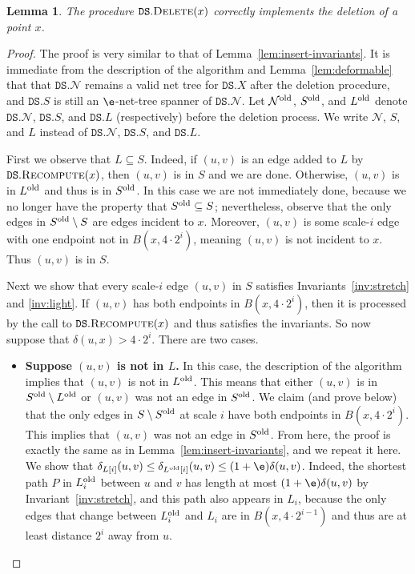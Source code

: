 \documentclass[11pt]{article}
\newtheorem{lemma}[theorem]{Lemma}
\newcommand{\cN}{\mathcal{N}}
\newcommand{\dist}{\ensuremath{\delta}}
\newcommand{\DS}{\texttt{DS}}
\newcommand{\points}{{\ensuremath{\DS.X}}}
\newcommand{\sparse}{{\ensuremath{\DS.S}}}
\newcommand{\net}{{\ensuremath{\DS.\cN}}}
\newcommand{\light}{{\ensuremath{\DS.L}}}
\begin{document}
\begin{lemma}
\label{lem:delete-invariants}
The procedure $\DS.\textsc{Delete}(x)$ correctly implements the deletion of a point $x$.    
\end{lemma}
\begin{proof}
The proof is very similar to that of Lemma~\ref{lem:insert-invariants}.
    It is immediate from the description of the algorithm and Lemma~\ref{lem:deformable} that that $\net$ remains a valid net tree for $\points$ after the deletion procedure, and $\sparse$ is still an $\e$-net-tree spanner of $\net$. Let $\cN^{\rm old}$, $S^{\rm old}$, and $L^{\rm old}$ denote $\net$, $\sparse$, and $\light$ (respectively) before the deletion process. We write $\cN$, $S$, and $L$ instead of $\net$, $\sparse$, and $\light$.


    First we observe that $L \subseteq S$. Indeed, if $(u,v)$ is an edge added to $L$ by $\DS.\textsc{Recompute}(x)$, then $(u,v)$ is in $S$ and we are done. Otherwise, $(u,v)$ is in $L^{\rm old}$ and thus is in $S^{\rm old}$. In this case we are not immediately done, because we no longer have the property that $S^{\rm old} \subseteq S$; nevertheless, observe that the only edges in $S^{\rm old} \setminus S$ are edges incident to $x$. Moreover, $(u,v)$ is some scale-$i$ edge with one endpoint not in $B(x, 4 \cdot 2^i)$,
    meaning $(u,v)$ is not incident to $x$. Thus $(u,v)$ is in $S$.

    Next we show that every scale-$i$ edge $(u,v)$ in $S$ satisfies Invariants~\ref{inv:stretch} and \ref{inv:light}. If $(u,v)$ has both endpoints in $B(x, 4 \cdot 2^i)$, then it is processed by the call to $\DS.\textsc{Recompute}(x)$ and thus satisfies the invariants. So now suppose that $\dist(u, x) > 4 \cdot 2^i$. There are two cases.
    \begin{itemize}
        \item \textbf{\boldmath Suppose $(u,v)$ is not in $L$.} In this case, the description of the algorithm implies that $(u,v)$ is not in $L^{\rm old}$. This means that either $(u,v)$ is in $S^{\rm old} \setminus L^{\rm old}$ or $(u,v)$ was not an edge in $S^{\rm old}$. We claim (and prove below) that the only edges in $S \setminus S^{\rm old}$ at scale $i$ have both endpoints in $B(x, 4 \cdot 2^i)$. This implies that $(u,v)$ was not an edge in $S^{\rm old}$.
        From here, the proof is exactly the same as in Lemma~\ref{lem:insert-invariants}, and we repeat it here. We show that $\dist_{L[i]}(u,v) \le \dist_{L^{\rm old}[i]}(u,v) \le (1+\e) \dist(u,v)$. Indeed, the shortest path $P$ in $L_i^{\rm old}$ between $u$ and $v$ has length at most $(1+\e) \dist(u,v)$ by Invariant~\ref{inv:stretch}, and this path also appears in $L_i$, because the only edges that change between $L_i^{\rm old}$ and $L_i$ are in $B(x, 4 \cdot 2^{i-1})$ and thus are at least distance $2^i$ away from $u$.


\end{itemize}
\end{proof}
\end{document}
